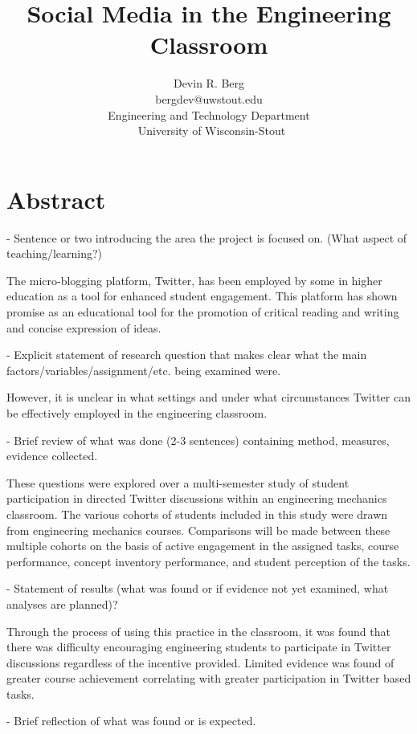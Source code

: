 \documentclass[12pt]{article}
\title{\large \textbf{Social Media in the Engineering Classroom}} %
\author{\vspace{-5ex}}
\author{\normalsize Devin R. Berg\\
\normalsize bergdev@uwstout.edu\\
\normalsize Engineering and Technology Department\\\
\normalsize University of Wisconsin-Stout}
\date{\vspace{-5ex}} %
\begin{document}
\raggedright
\maketitle
\thispagestyle{empty}
\pagestyle{empty}

\section*{Abstract}
- Sentence or two introducing the area the project is focused on. (What aspect of teaching/learning?)

The micro-blogging platform, Twitter, has been employed by some in higher education as a tool for enhanced student engagement. This platform has shown promise as an educational tool for the promotion of critical reading and writing and concise expression of ideas.

- Explicit statement of research question that makes clear what the main factors/variables/assignment/etc. being examined were.

However, it is unclear in what settings and under what circumstances Twitter can be effectively employed in the engineering classroom.

- Brief review of what was done (2-3 sentences) containing method, measures, evidence collected.

These questions were explored over a multi-semester study of student participation in directed Twitter discussions within an engineering mechanics classroom. The various cohorts of students included in this study were drawn from engineering mechanics courses. Comparisons will be made between these multiple cohorts on the basis of active engagement in the assigned tasks, course performance, concept inventory performance, and student perception of the tasks.

- Statement of results (what was found or if evidence not yet examined, what analyses are planned)?

Through the process of using this practice in the classroom, it was found that there was difficulty encouraging engineering students to participate in Twitter discussions regardless of the incentive provided. Limited evidence was found of greater course achievement correlating with greater participation in Twitter based tasks.

- Brief reflection of what was found or is expected.
\end{document}
